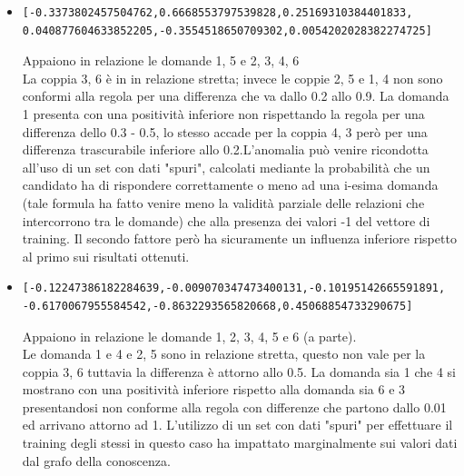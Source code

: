 \begin{itemize}
\item  \begin{verbatim}[-0.3373802457504762,0.6668553797539828,0.25169310384401833,
0.040877604633852205,-0.3554518650709302,0.0054202028382274725]\end{verbatim}
Appaiono in relazione le domande 1, 5 e 2, 3, 4, 6 \\
La coppia 3, 6 \`e in in relazione stretta; invece le coppie 2, 5 e 1, 4 non sono conformi alla regola per una differenza che va dallo 0.2 allo 0.9. La domanda 1 presenta con una positivit\`a inferiore non  rispettando la regola per una differenza dello 0.3 - 0.5, lo stesso accade per la coppia 4, 3 per\`o per una differenza trascurabile inferiore allo 0.2.L'anomalia pu\`o venire ricondotta all'uso di un set con dati "spuri", calcolati mediante la probabilit\`a che un candidato ha di rispondere correttamente o meno ad una i-esima domanda (tale formula ha fatto venire meno la validit\`a parziale delle relazioni che intercorrono tra le domande) che alla presenza dei valori -1 del vettore di training. Il secondo fattore per\`o ha sicuramente un influenza inferiore rispetto al primo sui risultati ottenuti.

\item  \begin{verbatim}[-0.12247386182284639,-0.009070347473400131,-0.10195142665591891,
-0.6170067955584542,-0.8632293565820668,0.45068854733290675]\end{verbatim}
Appaiono in relazione le domande 1, 2, 3, 4, 5  e 6 (a parte).\\
Le domanda 1 e 4 e 2, 5  sono in relazione stretta, questo non vale per la coppia 3, 6 tuttavia la differenza \`e attorno allo 0.5.
La domanda sia 1 che 4 si mostrano con una positivit\`a inferiore rispetto alla domanda sia 6 e 3 presentandosi non conforme alla regola con differenze che partono dallo 0.01 ed arrivano attorno ad 1. L'utilizzo di  un set con dati "spuri" per effettuare il training degli stessi in questo caso ha impattato marginalmente sui valori dati dal grafo della conoscenza.
\end{itemize}

